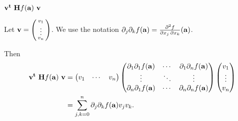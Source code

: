 \textbf{\(\vv^{\mathbf{t}} \ \mathbf{H} f (\aa) \ \vv\)}

Let \(\vv= \left( \begin{smallmatrix}
        v_1\\ \vdots \\v_n
    \end{smallmatrix} \right)  \).
We use the notation
\(\partial_{j}\partial_{k}f(\aa) = \frac{\partial^2 f}{\partial x_j\,\partial x_k} (\aa)\).

Then
\[
    \begin{aligned}
        \vv^{\mathbf{t}} \ \mathbf{H} f (\aa) \ \vv
         & =
        \begin{pmatrix}
            v_1 & \cdots & v_n
        \end{pmatrix}
        \begin{pmatrix}
            \partial_{1}\partial_{1}f(\aa) & \cdots &
            \partial_{1}\partial_{n}f(\aa)                   \\
            \vdots                         & \ddots & \vdots \\
            \partial_{n}\partial_{1}f(\aa) & \cdots &
            \partial_{n}\partial_{n}f(\aa)
        \end{pmatrix}
        \begin{pmatrix}
            v_1 \\ \vdots \\v_n
        \end{pmatrix} \\
         & = \sum_{j,k=0}^{n}
        \partial_{j}\partial_{k}f(\aa)
        v_j v_k.
    \end{aligned}
\]


